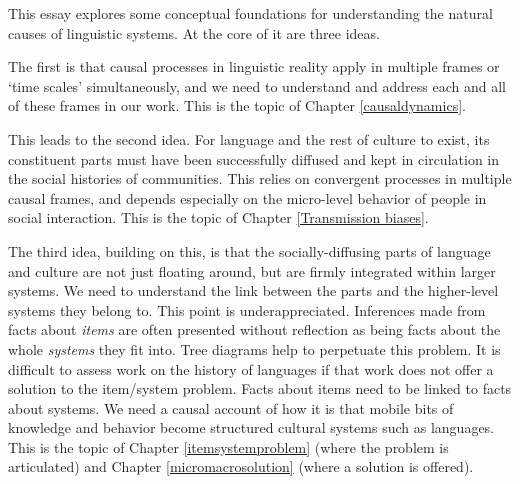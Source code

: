 


This essay explores some conceptual foundations for understanding the natural causes of linguistic systems. At the core of it are three ideas. 

The first is that causal processes in linguistic reality apply in multiple frames or \textquoteleft time scales’ simultaneously, and we need to understand and address each and all of these frames in our work. This is the topic of Chapter \ref{causaldynamics}. 

This leads to the second idea. For language and the rest of culture to exist, its constituent parts must have been successfully diffused and kept in circulation in the social histories of communities. This relies on convergent processes in multiple causal frames, and depends especially on the micro-level behavior of people in social interaction. This is the topic of Chapter \ref{Transmission biases}. 

The third idea, building on this, is that the socially-diffusing parts of language and culture are not just floating around, but are firmly integrated within larger systems. We need to understand the link between the parts and the higher-level systems they belong to. This point is underappreciated. Inferences made from facts about \textit{items} are often presented without reflection as being facts about the whole \textit{systems} they fit into. Tree diagrams help to perpetuate this problem. It is difficult to assess work on the history of languages if that work does not offer a solution to the item/system problem. Facts about items need to be linked to facts about systems. We need a causal account of how it is that mobile bits of knowledge and behavior become structured cultural systems such as languages. This is the topic of Chapter \ref{itemsystemproblem} (where the problem is articulated) and Chapter \ref{micromacrosolution} (where a solution is offered). 

